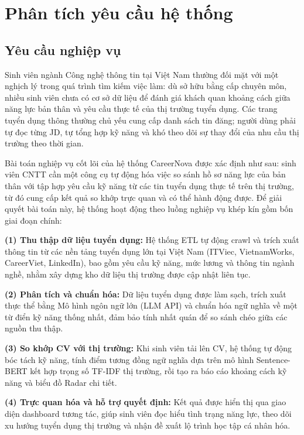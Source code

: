 \section{Phân tích yêu cầu hệ thống}

\subsection{Yêu cầu nghiệp vụ}

Sinh viên ngành Công nghệ thông tin tại Việt Nam thường đối mặt với một nghịch lý trong quá trình tìm kiếm việc làm: dù sở hữu bằng cấp chuyên môn, nhiều sinh viên chưa có cơ sở dữ liệu để đánh giá khách quan khoảng cách giữa năng lực bản thân và yêu cầu thực tế của thị trường tuyển dụng. Các trang tuyển dụng thông thường chủ yếu cung cấp danh sách tin đăng; người dùng phải tự đọc từng JD, tự tổng hợp kỹ năng và khó theo dõi sự thay đổi của nhu cầu thị trường theo thời gian.

Bài toán nghiệp vụ cốt lõi của hệ thống CareerNova được xác định như sau: sinh viên CNTT cần một công cụ tự động hóa việc so sánh hồ sơ năng lực của bản thân với tập hợp yêu cầu kỹ năng từ các tin tuyển dụng thực tế trên thị trường, từ đó cung cấp kết quả so khớp trực quan và có thể hành động được. Để giải quyết bài toán này, hệ thống hoạt động theo luồng nghiệp vụ khép kín gồm bốn giai đoạn chính:

\textbf{(1) Thu thập dữ liệu tuyển dụng:} Hệ thống ETL tự động crawl và trích xuất thông tin từ các nền tảng tuyển dụng lớn tại Việt Nam (ITViec, VietnamWorks, CareerViet, LinkedIn), bao gồm yêu cầu kỹ năng, mức lương và thông tin ngành nghề, nhằm xây dựng kho dữ liệu thị trường được cập nhật liên tục.

\textbf{(2) Phân tích và chuẩn hóa:} Dữ liệu tuyển dụng được làm sạch, trích xuất thực thể bằng Mô hình ngôn ngữ lớn (LLM API) và chuẩn hóa ngữ nghĩa về một từ điển kỹ năng thống nhất, đảm bảo tính nhất quán để so sánh chéo giữa các nguồn thu thập.

\textbf{(3) So khớp CV với thị trường:} Khi sinh viên tải lên CV, hệ thống tự động bóc tách kỹ năng, tính điểm tương đồng ngữ nghĩa dựa trên mô hình Sentence-BERT kết hợp trọng số TF-IDF thị trường, rồi tạo ra báo cáo khoảng cách kỹ năng và biểu đồ Radar chi tiết.

\textbf{(4) Trực quan hóa và hỗ trợ quyết định:} Kết quả được hiển thị qua giao diện dashboard tương tác, giúp sinh viên đọc hiểu tình trạng năng lực, theo dõi xu hướng tuyển dụng thị trường và nhận đề xuất lộ trình học tập cá nhân hóa.

